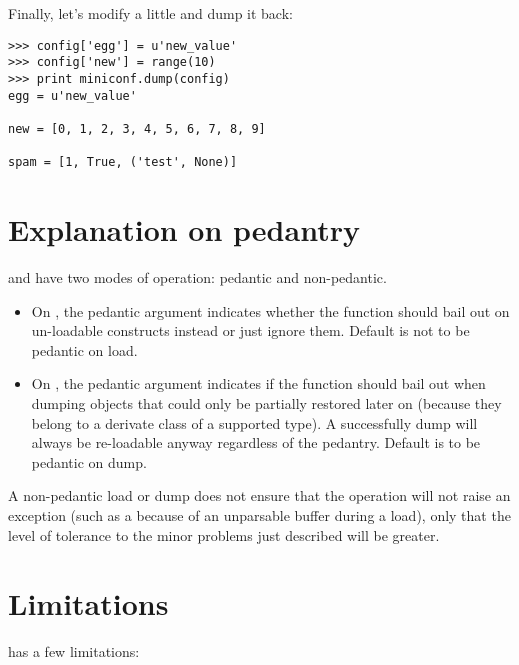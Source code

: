 \documentclass{howto}
\begin{document}
Finally, let's modify  a little and dump it back:

\begin{verbatim}
>>> config['egg'] = u'new_value'
>>> config['new'] = range(10)
>>> print miniconf.dump(config)
egg = u'new_value'

new = [0, 1, 2, 3, 4, 5, 6, 7, 8, 9]

spam = [1, True, ('test', None)]
\end{verbatim}

\section{Explanation on pedantry}

 and  have two modes of operation: pedantic and
non-pedantic.

\begin{itemize}
\item
On , the pedantic argument indicates whether the function should
bail out on un-loadable constructs instead or just ignore them. Default is not
to be pedantic on load.

\item
On , the pedantic argument indicates if the function should bail
out when dumping objects that could only be partially restored later on (because
they belong to a derivate class of a supported type). A successfully dump will
always be re-loadable anyway regardless of the pedantry. Default is to be
pedantic on dump.
\end{itemize}

A non-pedantic load or dump does not ensure that the operation will not raise an
exception (such as a  because of an unparsable buffer
during a load), only that the level of tolerance to the minor problems just
described will be greater.

\section{Limitations}

 has a few limitations:
\end{document}
